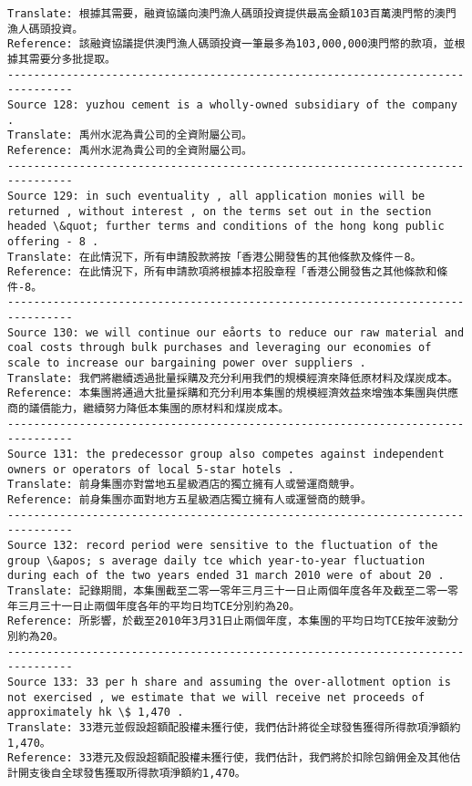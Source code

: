 \documentclass[11pt]{article}
\begin{document}
\begin{Verbatim}[commandchars=\\\{\}]
Translate: 根據其需要，融資協議向澳門漁人碼頭投資提供最高金額103百萬澳門幣的澳門漁人碼頭投資。
Reference: 該融資協議提供澳門漁人碼頭投資一筆最多為103,000,000澳門幣的款項，並根據其需要分多批提取。
--------------------------------------------------------------------------------
Source 128: yuzhou cement is a wholly-owned subsidiary of the company .
Translate: 禹州水泥為貴公司的全資附屬公司。
Reference: 禹州水泥為貴公司的全資附屬公司。
--------------------------------------------------------------------------------
Source 129: in such eventuality , all application monies will be returned , without interest , on the terms set out in the section headed \&quot; further terms and conditions of the hong kong public offering - 8 .
Translate: 在此情況下，所有申請股款將按「香港公開發售的其他條款及條件－8。
Reference: 在此情況下，所有申請款項將根據本招股章程「香港公開發售之其他條款和條件-8。
--------------------------------------------------------------------------------
Source 130: we will continue our eåorts to reduce our raw material and coal costs through bulk purchases and leveraging our economies of scale to increase our bargaining power over suppliers .
Translate: 我們將繼續透過批量採購及充分利用我們的規模經濟來降低原材料及煤炭成本。
Reference: 本集團將通過大批量採購和充分利用本集團的規模經濟效益來增強本集團與供應商的議價能力，繼續努力降低本集團的原材料和煤炭成本。
--------------------------------------------------------------------------------
Source 131: the predecessor group also competes against independent owners or operators of local 5-star hotels .
Translate: 前身集團亦對當地五星級酒店的獨立擁有人或營運商競爭。
Reference: 前身集團亦面對地方五星級酒店獨立擁有人或運營商的競爭。
--------------------------------------------------------------------------------
Source 132: record period were sensitive to the fluctuation of the group \&apos; s average daily tce which year-to-year fluctuation during each of the two years ended 31 march 2010 were of about 20 .
Translate: 記錄期間，本集團截至二零一零年三月三十一日止兩個年度各年及截至二零一零年三月三十一日止兩個年度各年的平均日均TCE分別約為20。
Reference: 所影響，於截至2010年3月31日止兩個年度，本集團的平均日均TCE按年波動分別約為20。
--------------------------------------------------------------------------------
Source 133: 33 per h share and assuming the over-allotment option is not exercised , we estimate that we will receive net proceeds of approximately hk \$ 1,470 .
Translate: 33港元並假設超額配股權未獲行使，我們估計將從全球發售獲得所得款項淨額約1,470。
Reference: 33港元及假設超額配股權未獲行使，我們估計，我們將於扣除包銷佣金及其他估計開支後自全球發售獲取所得款項淨額約1,470。

\end{Verbatim}
\end{document}
